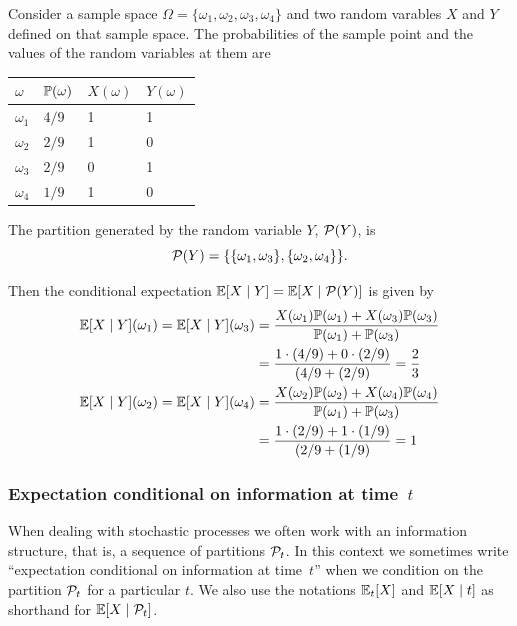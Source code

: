 \documentclass[11pt,reqno,openany]{amsbook}
\begin{document}
\begin{exmp}
  Consider a sample space $\Omega =
  \{\omega_1,\omega_2,\omega_3,\omega_4\}$ and two random
  varables $X$ and $Y$ defined on that sample space. The
  probabilities of the sample point and the values of the
  random variables at them are
  
  \begin{center}
    \begin{tabular}{llll}
      \hline
      $\omega$&$\P(\omega)$&$X(\omega)$&$Y(\omega)$\\
      \hline
      $\omega_1$&$4/9$&1&1\\
      $\omega_2$&$2/9$&1&0\\
      $\omega_3$&$2/9$&0&1\\
      $\omega_4$&$1/9$&1&0\\
      \hline
    \end{tabular}
  \end{center}

  The partition generated by the random variable $Y$,
  $\setset{P}(Y)$, is 
  \[\setset{P}(Y) =
  \{\{\omega_1,\omega_3\},\{\omega_2,\omega_4\}\}.\]

  Then the conditional expectation $\E[X\mid Y]=\E[X\mid
  \setset{P}(Y)]$ is given by
  \begin{align*}
    \E[X \mid Y] (\omega_1)=\E[X \mid Y](\omega_3) &=
    \frac{X(\omega_1)\P(\omega_1)+X(\omega_3)\P(\omega_3)}
    {\P(\omega_1)+\P(\omega_3)}\\
    &=\frac{1\cdot (4/9) + 0\cdot (2/9)}{(4/9+(2/9)} = \frac{2}{3}\\
    \E[X \mid Y] (\omega_2)=\E[X \mid Y](\omega_4) &=
    \frac{X(\omega_2)\P(\omega_2)+X(\omega_4)\P(\omega_4)}
    {\P(\omega_1)+\P(\omega_3)}\\
    &=\frac{1\cdot (2/9) + 1\cdot (1/9)}{(2/9+(1/9)} = 1
  \end{align*}
\end{exmp}
\subsubsection{Expectation conditional on information at
  time~$t$}
When dealing with stochastic processes we often work with an
information structure, that is, a sequence of partitions
$\setset{P}_t$. In this context we sometimes write
``expectation conditional on information at time~$t$'' when
we condition on the partition $\setset{P}_t$ for a
particular $t$. We also use the notations $\E_t[X]$ and
$\E[X \mid t]$ as shorthand for $\E[X \mid \setset{P}_t]$.
\end{document}
